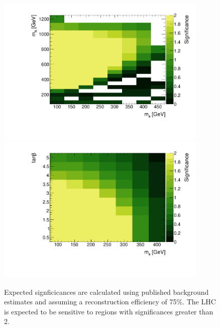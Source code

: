 \begin{figure}
\label{fig:expected_significance_monozll}
\centering
\includegraphics[width=0.9\textwidth]{texinputs/04_grid/figures/monoz/leptonic/mAma_Significance_ll.pdf}
\includegraphics[width=0.9\textwidth]{texinputs/04_grid/figures/monoz/leptonic/tanbma_Significance_ll.pdf}
\caption{Expected signficicances are calculated using published background estimates and assuming a reconstruction efficiency of 75\%.  The LHC is expected to be sensitive to regions with significances greater than 2.}
\end{figure}

